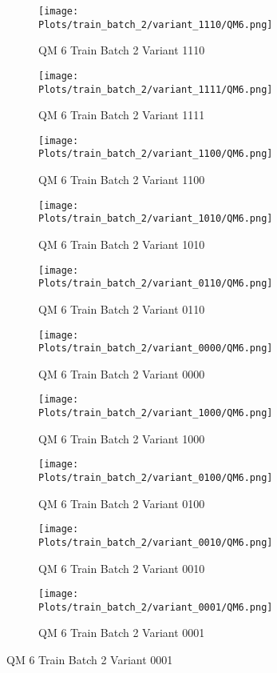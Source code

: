 \documentclass{DissertateFigs}
\begin{document}
\begin{figure}[t!]
    \begin{subfigure}{0.47\textwidth}
    \texttt{[image: Plots/train\_batch\_2/variant\_1110/QM6.png]}
    \caption{QM 6 Train Batch 2 Variant 1110}
    \end{subfigure}
    \begin{subfigure}{0.47\textwidth}
    \texttt{[image: Plots/train\_batch\_2/variant\_1111/QM6.png]}
    \caption{QM 6 Train Batch 2 Variant 1111}
    \end{subfigure}

\medskip

    \begin{subfigure}{0.47\textwidth}
    \texttt{[image: Plots/train\_batch\_2/variant\_1100/QM6.png]}
    \caption{QM 6 Train Batch 2 Variant 1100}
    \end{subfigure}
    \begin{subfigure}{0.47\textwidth}
    \texttt{[image: Plots/train\_batch\_2/variant\_1010/QM6.png]}
    \caption{QM 6 Train Batch 2 Variant 1010}
    \end{subfigure}

\medskip

    \begin{subfigure}{0.47\textwidth}
    \texttt{[image: Plots/train\_batch\_2/variant\_0110/QM6.png]}
    \caption{QM 6 Train Batch 2 Variant 0110}
    \end{subfigure}
    \begin{subfigure}{0.47\textwidth}
    \texttt{[image: Plots/train\_batch\_2/variant\_0000/QM6.png]}
    \caption{QM 6 Train Batch 2 Variant 0000}
    \end{subfigure}

\medskip

    \begin{subfigure}{0.47\textwidth}
    \texttt{[image: Plots/train\_batch\_2/variant\_1000/QM6.png]}
    \caption{QM 6 Train Batch 2 Variant 1000}
    \end{subfigure}
    \begin{subfigure}{0.47\textwidth}
    \texttt{[image: Plots/train\_batch\_2/variant\_0100/QM6.png]}
    \caption{QM 6 Train Batch 2 Variant 0100}
    \end{subfigure}

\medskip

    \begin{subfigure}{0.47\textwidth}
    \texttt{[image: Plots/train\_batch\_2/variant\_0010/QM6.png]}
    \caption{QM 6 Train Batch 2 Variant 0010}
    \end{subfigure}
    \begin{subfigure}{0.47\textwidth}
    \texttt{[image: Plots/train\_batch\_2/variant\_0001/QM6.png]}
    \caption{QM 6 Train Batch 2 Variant 0001}
    \end{subfigure}


\end{figure}
\end{document}
